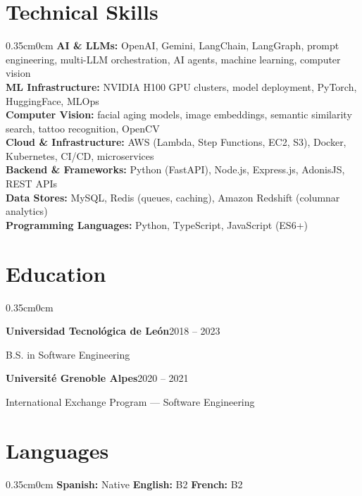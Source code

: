 \documentclass[a4paper, 10pt]{article}
\newcommand{\entryheader}[2]{
  \par\noindent\textbf{#1}\hfill#2\par
}
\begin{document}
\section{Technical Skills}
\begin{adjustwidth}{0.35cm}{0cm}
\textbf{AI \& LLMs:} OpenAI, Gemini, LangChain, LangGraph, prompt engineering, multi-LLM orchestration, AI agents, machine learning, computer vision \\[2pt]
\textbf{ML Infrastructure:} NVIDIA H100 GPU clusters, model deployment, PyTorch, HuggingFace, MLOps \\[2pt]
\textbf{Computer Vision:} facial aging models, image embeddings, semantic similarity search, tattoo recognition, OpenCV \\[2pt]
\textbf{Cloud \& Infrastructure:} AWS (Lambda, Step Functions, EC2, S3), Docker, Kubernetes, CI/CD, microservices \\[2pt]
\textbf{Backend \& Frameworks:} Python (FastAPI), Node.js, Express.js, AdonisJS, REST APIs \\[2pt]
\textbf{Data Stores:} MySQL, Redis (queues, caching), Amazon Redshift (columnar analytics) \\[2pt]
\textbf{Programming Languages:} Python, TypeScript, JavaScript (ES6+)
\end{adjustwidth}

\section{Education}
\begin{adjustwidth}{0.35cm}{0cm}
\entryheader{Universidad Tecnológica de León}{2018 -- 2023}
B.S. in Software Engineering

\vspace{0.1cm}

\entryheader{Université Grenoble Alpes}{2020 -- 2021}
International Exchange Program --- Software Engineering
\end{adjustwidth}

\section{Languages}
\begin{adjustwidth}{0.35cm}{0cm}
\textbf{Spanish:} Native \quad \textbf{English:} B2 \quad \textbf{French:} B2
\end{adjustwidth}
\end{document}
